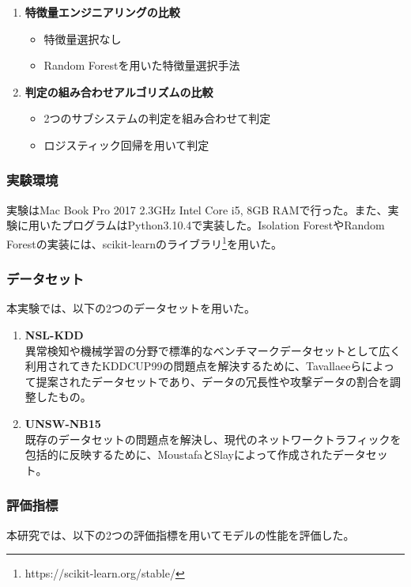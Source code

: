 \documentclass{css}
\begin{document}
\begin{enumerate}
    \item \textbf{特徴量エンジニアリングの比較}
        \begin{itemize}
            \item 特徴量選択なし
            \item Random Forestを用いた特徴量選択手法
        \end{itemize}
    \item \textbf{判定の組み合わせアルゴリズムの比較}
        \begin{itemize}
            \item 2つのサブシステムの判定を組み合わせて判定
            \item ロジスティック回帰を用いて判定
        \end{itemize}
\end{enumerate}

\subsubsection{実験環境}

実験はMac Book Pro 2017 2.3GHz Intel Core i5, 8GB RAMで行った。また、実験に用いたプログラムはPython3.10.4で実装した。Isolation ForestやRandom Forestの実装には、scikit-learnのライブラリ\footnote[1]{https://scikit-learn.org/stable/}を用いた。

\subsubsection{データセット}
本実験では、以下の2つのデータセットを用いた。

\begin{enumerate}
    \item \textbf{NSL-KDD}\\
        異常検知や機械学習の分野で標準的なベンチマークデータセットとして広く利用されてきたKDDCUP99\cite{KDDCUP99}の問題点を解決するために、Tavallaeeらによって提案されたデータセットであり、データの冗長性や攻撃データの割合を調整したもの\cite{Tavallaee2009-we}。
    \item \textbf{UNSW-NB15}\\
        既存のデータセットの問題点を解決し、現代のネットワークトラフィックを包括的に反映するために、MoustafaとSlayによって作成されたデータセット\cite{Moustafa2015-cg}。
\end{enumerate}


\subsubsection{評価指標}
本研究では、以下の2つの評価指標を用いてモデルの性能を評価した。
\end{document}
